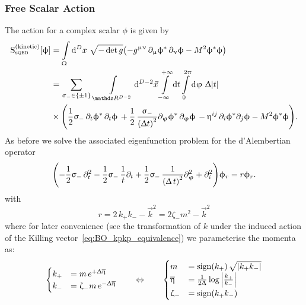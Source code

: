 \subsubsection{Free Scalar Action}

The action for a complex scalar $\phi$ is given by
\begin{equation}
  \begin{split}
    \rS_{\text{s}\qed}^{(\text{kinetic})}\qty[ \phi ]
    & =
    \int\limits_{\Omega} \dd[D]{x}\,
    \sqrt{- \det g}
    \qty(
      -g^{\mu\nu}\, \ipd{\mu} \phi^*\, \ipd{\nu} \phi
      -M^2  \phi^* \phi
    )
    \\
    & =
    \sum_{\sigma_- \in \qty{\pm 1}}\,
    \int\limits_{\R^{D-2}} \dd[D-2]{\vec{x}}
    \infinfint{t}
    \finiteint{\varphi}{0}{2\pi}\,
    \Delta \abs{t}
    \\
    & \times
    \qty(
      \frac{1}{2} \sigma_-\,
      \ipd{t} \phi^*\, \ipd{t} \phi\,
      +
      \frac{1}{2}\, \frac{\sigma_-}{\qty(\Delta t)^2}
      \ipd{\varphi} \phi^*\, \ipd{\varphi}  \phi\,
      -
      \eta^{ij}\, \ipd{i} \phi^* \ipd{j} \phi
      -
      M^2 \phi^* \phi
    ).
  \end{split}
\end{equation}
As before we solve the associated eigenfunction problem for the d'Alembertian operator
\begin{align}
  \qty(
    -
    \frac{1}{2} \upsigma_-\, \partial_{t}^2
    -
    \frac{1}{2} \upsigma_-\, \frac{1}{t} \partial_{t}
    +
    \frac{1}{2} \upsigma_-\, \frac{1}{\qty(\Updelta\, t)^2} \partial_{\upvarphi}^2
    +
    \partial_{i}^2
  )
  \upphi_r
  =
  r \upphi_r
  .
\end{align}
with
\begin{equation}
  r = 2\, k_+ k_- - \vec{k}^2 = 2 \zeta_- m^2  - \vec{k}^2      
\end{equation}
where for later convenience (see the transformation of $k$ under the induced action of the Killing vector~\eqref{eq:BO_kpkp_equivalence}) we parameterise the momenta as:
\begin{equation}
  \begin{cases}
    k_+ & = m\, e^{+ \Updelta \overline{\upeta}}
    \\
    k_- & = \upzeta_- m\, e^{- \Updelta \overline{\upeta}}
  \end{cases}
  \qquad
  \Leftrightarrow
  \qquad
  \begin{cases}
    m & = \mathrm{sign}(k_+)\, \sqrt{ \abs{k_+ k_-} }
    \\
    \overline{\upeta} & = \frac{1}{2 \Updelta} \log\abs{\frac{k_+}{k_-}}
    \\
    \upzeta_- & = \mathrm{sign}(k_+ k_-)
  \end{cases}
  \label{eq:kpkm_parametrization}
\end{equation}
